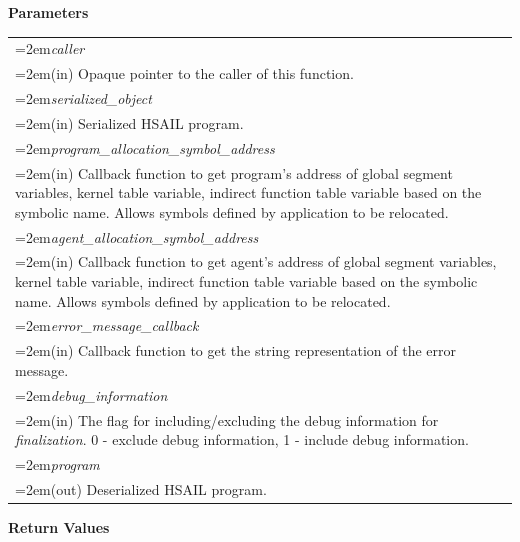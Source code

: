 \documentclass[final]{book}
\newcommand{\hsaarg}[1]{\textit{#1}}
\begin{document}
\noindent\textbf{Parameters}\\[-6mm]
\noindent\begin{longtable}{@{}>{\hangindent=2em}p{\textwidth}}
\hsaarg{caller}\\\hspace{2em}(in) Opaque pointer to the caller of this function.\\[2mm]
\hsaarg{serialized_\-object}\\\hspace{2em}(in) Serialized HSAIL program.\\[2mm]
\hsaarg{program_\-allocation_\-symbol_\-address}\\\hspace{2em}(in) Callback function to get program's address of global segment variables, kernel table variable, indirect function table variable based on the symbolic name. Allows symbols defined by application to be relocated.\\[2mm]
\hsaarg{agent_\-allocation_\-symbol_\-address}\\\hspace{2em}(in) Callback function to get agent's address of global segment variables, kernel table variable, indirect function table variable based on the symbolic name. Allows symbols defined by application to be relocated.\\[2mm]
\hsaarg{error_\-message_\-callback}\\\hspace{2em}(in) Callback function to get the string representation of the error message.\\[2mm]
\hsaarg{debug_\-information}\\\hspace{2em}(in) The flag for including/excluding the debug information for \textit{finalization}. 0 - exclude debug information, 1 - include debug information.\\[2mm]
\hsaarg{program}\\\hspace{2em}(out) Deserialized HSAIL program.
\end{longtable}
\vspace{-5mm}\noindent\textbf{Return Values}\\[-6mm]
\end{document}
